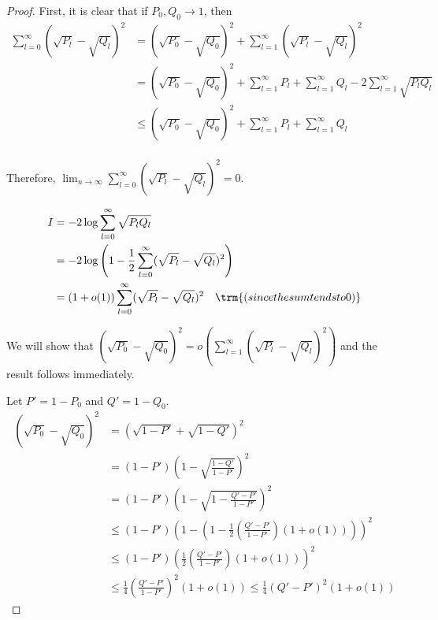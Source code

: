 \documentclass{article}
\begin{document}
\begin{proof}
First, it is clear that if $P_0, Q_0 \rightarrow 1$, then 
\begin{align*}
\sum_{l=0}^\infty (\sqrt{P_l} - \sqrt{Q_l})^2 &= 
   (\sqrt{P_0} - \sqrt{Q_0})^2 + \sum_{l=1}^\infty (\sqrt{P_l} - \sqrt{Q_l})^2 \\
 &= (\sqrt{P_0} - \sqrt{Q_0})^2 + \sum_{l=1}^\infty P_l + \sum_{l=1}^\infty Q_l - 
  2 \sum_{l=1}^\infty \sqrt{P_l Q_l} \\
 &\leq  (\sqrt{P_0} - \sqrt{Q_0})^2 + \sum_{l=1}^\infty P_l + \sum_{l=1}^\infty Q_l \\
\end{align*}

Therefore, $\lim_{n\rightarrow \infty} \sum_{l=0}^\infty (\sqrt{P_l} - \sqrt{Q_l})^2 = 0$. 

\begin{align*}
I &= -2 \log \sum_{l=0}^\infty \sqrt{P_l Q_l} \\
  &= -2 \log \left( 1 - \frac{1}{2} \sum_{l=0}^\infty (\sqrt{P_l} - \sqrt{Q_l})^2 \right) \\ 
  &= (1 + o(1)) \sum_{l=0}^\infty (\sqrt{P_l} - \sqrt{Q_l})^2 \quad \trm{(since the sum tends to 0)}
\end{align*}

We will show that $(\sqrt{P_0} - \sqrt{Q_0})^2 = o \left( \sum_{l=1}^\infty (\sqrt{P_l} - \sqrt{Q_l} )^2 \right)$ and the result follows immediately.

Let $P' = 1 - P_0$ and $Q' = 1 - Q_0$. 
\begin{align*}
(\sqrt{P_0} - \sqrt{Q_0})^2 &= (\sqrt{1-P'} + \sqrt{1-Q'})^2 \\
  &= (1-P') \left( 1 - \sqrt{ \frac{1-Q'}{1-P'}} \right)^2 \\
 &= (1-P') \left( 1 - \sqrt{ 1 - \frac{Q' - P'}{1 - P'} } \right)^2 \\
 &\leq (1-P') \left( 1 - (1 - \frac{1}{2} \left( \frac{Q' - P'}{1 - P'} \right) (1+o(1)) ) \right)^2 \\
 &\leq (1 - P') \left( \frac{1}{2} \left( \frac{Q'-P'}{1-P'} \right) (1+o(1)) \right)^2 \\
 &\leq \frac{1}{4} \left( \frac{Q' - P'}{1 - P'} \right)^2 (1 + o(1)) \leq \frac{1}{4} ( Q' - P')^2 (1 + o(1)) 
\end{align*}


\end{proof}
\end{document}
